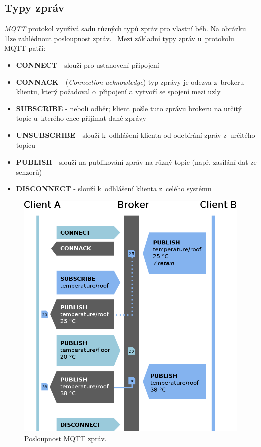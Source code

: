 \subsection*{Typy zpráv}
\emph{MQTT} protokol využívá sadu různých typů zpráv pro vlastní běh. Na obrázku \ref{figure:mqtt_flow}lze zahlédnout posloupnost zpráv.~\cite{wiki:mqtt_broker}
Mezi základní typy zpráv u~protokolu MQTT patří:
\begin{itemize}
  \item \textbf{CONNECT} - slouží pro ustanovení připojení
  \item \textbf{CONNACK} - (\emph{Connection acknowledge}) typ zprávy je odezva z~brokeru klientu, který požadoval o~připojení a vytvoří se spojení mezi uzly
  \item \textbf{SUBSCRIBE} - neboli odběr; klient pošle tuto zprávu brokeru na určitý topic u~kterého chce přijímat dané zprávy
  \item \textbf{UNSUBSCRIBE} - slouží k~odhlášení klienta od odebírání zpráv z~určitého topicu
  \item \textbf{PUBLISH} - slouží na publikování zpráv na různý topic (např. zasílání dat ze senzorů)
  \item \textbf{DISCONNECT} - slouží k~odhlášení klienta z~celého systému
\end{itemize}

\begin{figure}[ht]
  \centering
  \includegraphics[width=.7 \linewidth]{obrazky-figures/mqtt_flow.png}
  \caption{Posloupnost MQTT zpráv.~\cite{wiki:mqtt}}
  \label{figure:mqtt_flow}
\end{figure}

